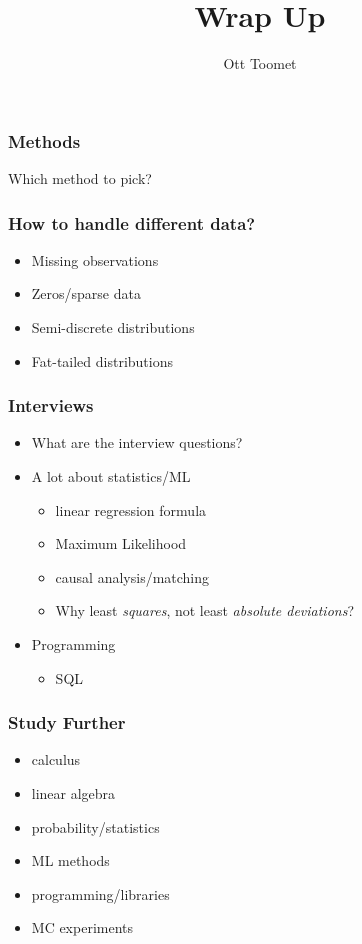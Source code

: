 \documentclass[mathserif,aspectratio=169]{beamer}
\title{Wrap Up}
\author{Ott Toomet}
\begin{document}
\begin{frame}
  \maketitle
\end{frame}

\begin{frame}
  \frametitle{Methods}
  Which method to pick?
\end{frame}

\begin{frame}
  \frametitle{How to handle different data?}
  \begin{itemize}
  \item Missing observations
  \item Zeros/sparse data
  \item Semi-discrete distributions
  \item Fat-tailed distributions
  \end{itemize}
\end{frame}

\begin{frame}
  \frametitle{Interviews}
  \begin{itemize}
  \item What are the interview questions?
  \item A lot about statistics/ML
    \begin{itemize}
    \item linear regression formula
    \item Maximum Likelihood
    \item causal analysis/matching
    \item Why least \emph{squares}, not least \emph{absolute deviations}?
    \end{itemize}
  \item Programming
    \begin{itemize}
    \item SQL
    \end{itemize}
  \end{itemize}
\end{frame}

\begin{frame}
  \frametitle{Study Further \smiley}
  \begin{itemize}
  \item calculus
  \item linear algebra
  \item probability/statistics
  \item ML methods
  \item programming/libraries
  \item MC experiments
  \end{itemize}
\end{frame}
\end{document}
